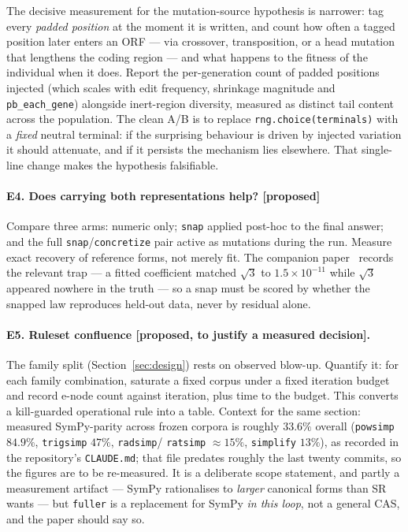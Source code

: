 \documentclass[sigconf]{acmart}
\begin{document}
The decisive measurement for the mutation-source hypothesis is narrower: tag every
\emph{padded position} at the moment it is written, and count how often a tagged
position later enters an ORF --- via crossover, transposition, or a head mutation
that lengthens the coding region --- and what happens to the fitness of the
individual when it does. Report the per-generation count of padded positions
injected (which scales with edit frequency, shrinkage magnitude and
\texttt{pb\_each\_gene}) alongside inert-region diversity, measured as distinct
tail content across the population. The clean A/B is to replace
\texttt{rng.choice(terminals)} with a \emph{fixed} neutral terminal: if the
surprising behaviour is driven by injected variation it should attenuate, and if it
persists the mechanism lies elsewhere. That single-line change makes the hypothesis
falsifiable.

\paragraph{E4. Does carrying both representations help? [proposed]} Compare three
arms: numeric only; \texttt{snap} applied post-hoc to the final answer; and the
full \texttt{snap}/\texttt{concretize} pair active as mutations during the run.
Measure exact recovery of reference forms, not merely fit. The companion
paper~\cite{morgan2026tournaments} records the relevant trap --- a fitted
coefficient matched $\sqrt3$ to $1.5\times10^{-11}$ while $\sqrt3$ appeared
nowhere in the truth --- so a snap must be scored by whether the snapped law
reproduces held-out data, never by residual alone.

\paragraph{E5. Ruleset confluence [proposed, to justify a measured decision].}
The family split (Section~\ref{sec:design}) rests on observed blow-up. Quantify
it: for each family combination, saturate a fixed corpus under a fixed iteration
budget and record e-node count against iteration, plus time to the budget. This
converts a kill-guarded operational rule into a table. Context for the same
section: measured SymPy-parity across frozen corpora is roughly $33.6\%$ overall
(\texttt{powsimp} $84.9\%$, \texttt{trigsimp} $47\%$, \texttt{radsimp}/%
\texttt{ratsimp} $\approx15\%$, \texttt{simplify} $13\%$), as recorded in the
repository's \texttt{CLAUDE.md}; that file predates roughly the last twenty
commits, so the figures are to be re-measured. It is a deliberate
scope statement, and partly a measurement artifact --- SymPy rationalises to
\emph{larger} canonical forms than SR wants --- but \texttt{fuller} is a
replacement for SymPy \emph{in this loop}, not a general CAS, and the paper should
say so.
\end{document}
